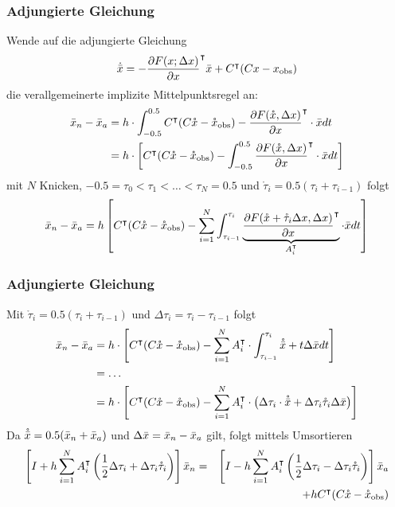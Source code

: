 \begin{frame}[<+->]
\frametitle{Adjungierte Gleichung}
Wende auf die adjungierte Gleichung
\begin{align}
 \dot {\bar{x}} =  - \frac{\partial F(x;\Delta x)}{\partial x}^\intercal \bar{x} + C^\intercal (Cx-x_\text{obs}) 
\end{align}
\pause
die verallgemeinerte implizite Mittelpunktsregel an:
\begin{align}
\bar{x}_n - \bar{x}_a &= h\cdot \int_{-0.5}^{0.5}C^\intercal(C\mathring{x}-\mathring x_\text{obs}) - \frac{\partial F(\mathring{x},\Delta x)}{\partial x}^\intercal \cdot \bar{x} dt\\
		  &= h\cdot \left[ C^\intercal(C\mathring{x}-\mathring x_\text{obs}) -\int_{-0.5}^{0.5} \frac{\partial F(\mathring{x},\Delta x)}{\partial x}^\intercal \cdot \bar{x} dt\right]
\end{align}
\pause
mit $N$ Knicken, $-0.5 = \tau_0 <\tau_1 <\ldots < \tau_N=0.5$ und $\mathring \tau_i = 0.5 (\tau_i +\tau_{i-1})$ folgt
\begin{align}
\bar{x}_n - \bar{x}_a &= h\left[ C^\intercal(C\mathring{x}-\mathring x_\text{obs}) - \sum_{i=1}^N \int_{\tau_{i-1}}^{\tau_{i}}\underbrace{\frac{\partial F(\mathring{x}+\mathring \tau_i\Delta x,\Delta x)}{\partial x}^\intercal}_{A_i^\intercal} \cdot \bar{x} dt\right]\\
\end{align}
\end{frame}

\begin{frame}[<+->]
\frametitle{Adjungierte Gleichung}
Mit  $\mathring \tau_i = 0.5 (\tau_i +\tau_{i-1})$ und $\Delta \tau_i = \tau_i-\tau_{i-1}$ folgt
\pause
\begin{align}
\bar{x}_n - \bar{x}_a &= h\cdot \left[C^\intercal(C\mathring{x} -\mathring x_\text{obs}) - \sum_{i=1}^N A_i^\intercal \cdot \int_{\tau_{i-1}}^{\tau_{i}} \mathring {\bar{x}} + t\Delta \bar{x} dt\right]\\
		  &= \ldots\\
		  &= h\cdot \left[C^\intercal(C\mathring{x} -\mathring x_\text{obs}) - \sum_{i=1}^N A_i^\intercal \cdot \left( \Delta \tau_i\cdot \mathring {\bar{x}} +  \Delta \tau_i \mathring \tau_i \Delta \bar{x} \right)\right]
\end{align}
\pause
Da $\mathring {\bar{x}} = 0.5(\bar{x}_n + \bar{x}_a)$ und $\Delta \bar{x} = \bar{x}_n-\bar{x}_a$ gilt, folgt mittels Umsortieren
\[
\begin{aligned}
\left[I +h\sum_{i=1}^N A_i^\intercal \left(\frac{1}{2} \Delta \tau_i +\Delta \tau_i \mathring \tau_i\right) \right]\bar{x}_n &= 
&\left[I - h\sum_{i=1}^N A_i^\intercal  \left(\frac{1}{2}\Delta \tau_i-\Delta \tau_i \mathring \tau_i\right)\right]\bar{x}_a \\
&&+h C^\intercal(C\mathring{x} -\mathring x_\text{obs})
\end{aligned}
\]
\end{frame}

